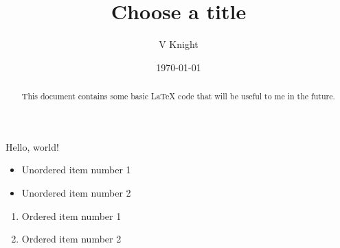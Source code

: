 \documentclass{article} %
\title{Choose a title}
\author{V Knight}
\date{\today}
\begin{document}

\begin{abstract}
This document contains some basic LaTeX code that will be useful to me in the future.
\end{abstract}


\maketitle

Hello, world!

\begin{itemize}
	\item Unordered item number 1
	\item Unordered item number 2
\end{itemize}

\begin{enumerate}
	\item Ordered item number 1
	\item Ordered item number 2
\end{enumerate}
\end{document}
